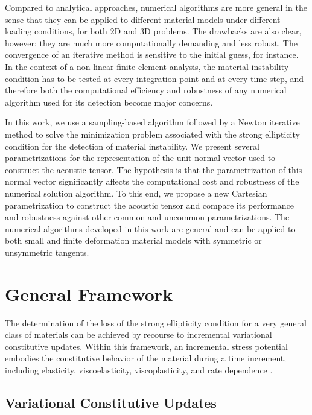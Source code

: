 \documentclass[12pt]{article}
\numberwithin{equation}{section}
\begin{document}
Compared to analytical approaches, numerical algorithms are more
general in the sense that they can be applied to different material
models under different loading conditions, for both 2D and 3D
problems. The drawbacks are also clear, however: they are much more
computationally demanding and less robust. The convergence of an
iterative method is sensitive to the initial guess, for instance. In
the context of a non-linear finite element analysis, the material
instability condition has to be tested at every integration point and
at every time step, and therefore both the computational efficiency
and robustness of any numerical algorithm used for its detection
become major concerns.

In this work, we use a sampling-based algorithm followed by a Newton
iterative method to solve the minimization problem associated with the
strong ellipticity condition for the detection of material
instability. We present several parametrizations for the
representation of the unit normal vector used to construct the
acoustic tensor. The hypothesis is that the parametrization of this
normal vector significantly affects the computational cost and
robustness of the numerical solution algorithm. To this end, we
propose a new Cartesian parametrization to construct the acoustic
tensor and compare its performance and robustness against other common
and uncommon parametrizations. The numerical algorithms developed in
this work are general and can be applied to both small and finite
deformation material models with symmetric or unsymmetric tangents.

\section{General Framework}

The determination of the loss of the strong ellipticity condition for
a very general class of materials can be achieved by recourse to
incremental variational constitutive updates. Within this framework,
an incremental stress potential embodies the constitutive behavior of
the material during a time increment, including elasticity,
viscoelasticity, viscoplasticity, and rate dependence
\citep{Ortiz.Stainier:1999, Lambrecht.etal:2003,
  Miehe.etal:2004, Weinberg.etal:2006,
  Fancello.etal:2006, Mosler.Bruhns:2010,
  Bleier.Mosler:2012}.

\subsection{Variational Constitutive Updates}
\end{document}

